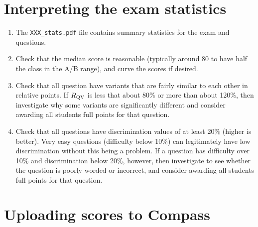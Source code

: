 \documentclass{article}
\begin{document}
\section{Interpreting the exam statistics}

\begin{enumerate}
\item The \texttt{XXX_stats.pdf} file contains summary statistics for
  the exam and questions.
\item Check that the median score is reasonable (typically around 80
  to have half the class in the A/B range), and curve the scores if
  desired.
\item Check that all question have variants that are fairly similar to
  each other in relative points. If $R_{\rm QV}$ is less that about
  80\% or more than about 120\%, then investigate why some variants
  are significantly different and consider awarding all students full
  points for that question.
\item Check that all questions have discrimination values of at least
  20\% (higher is better). Very easy questions (difficulty below 10\%)
  can legitimately have low discrimination without this being a
  problem. If a question has difficulty over 10\% and discrimination
  below 20\%, however, then investigate to see whether the question is
  poorly worded or incorrect, and consider awarding all students full
  points for that question.
\end{enumerate}

\section{Uploading scores to Compass}
\end{document}
